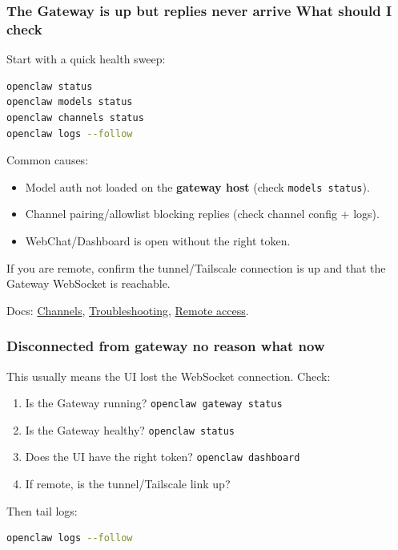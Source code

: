 \subsubsection{The Gateway is up but replies never arrive What should I check}


Start with a quick health sweep:

\begin{lstlisting}[language=bash]
openclaw status
openclaw models status
openclaw channels status
openclaw logs --follow
\end{lstlisting}


Common causes:

\begin{itemize}
  \item Model auth not loaded on the \textbf{gateway host} (check \texttt{models status}).
  \item Channel pairing/allowlist blocking replies (check channel config + logs).
  \item WebChat/Dashboard is open without the right token.
\end{itemize}


If you are remote, confirm the tunnel/Tailscale connection is up and that the
Gateway WebSocket is reachable.

Docs: \href{/channels}{Channels}, \href{/gateway/troubleshooting}{Troubleshooting}, \href{/gateway/remote}{Remote access}.

\subsubsection{Disconnected from gateway no reason what now}


This usually means the UI lost the WebSocket connection. Check:

\begin{enumerate}
  \item Is the Gateway running? \texttt{openclaw gateway status}
  \item Is the Gateway healthy? \texttt{openclaw status}
  \item Does the UI have the right token? \texttt{openclaw dashboard}
  \item If remote, is the tunnel/Tailscale link up?
\end{enumerate}


Then tail logs:

\begin{lstlisting}[language=bash]
openclaw logs --follow
\end{lstlisting}


